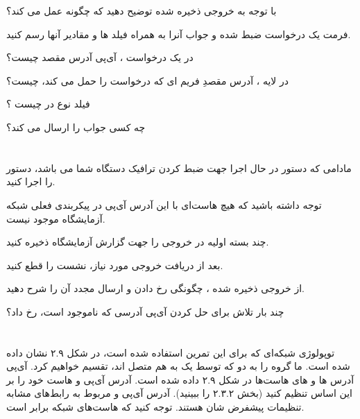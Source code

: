 \documentclass{../UTNetLabFa}
\begin{document}
	\begin{report}
		\item
		با توجه به خروجی ذخیره شده  توضیح دهید که  چگونه عمل می کند؟ 
		\item فرمت یک درخواست ضبط شده  و جواب آنرا به همراه فیلد ها و مقادیر آنها رسم کنید.
		\item در یک درخواست  ، آی‌پی آدرس مقصد چیست؟
		\item در لایه  ، آدرس  مقصدِ فریم ای که درخواست  را حمل می کند، چیست؟
		\item فیلد نوع  در  چیست ؟	
		\item چه کسی جواب  را ارسال می کند؟
	\end{report}
	
	\section{\textLR{ARP timeout}}
	
	مادامی که دستور  در حال اجرا جهت ضبط کردن ترافیک دستگاه شما می باشد، دستور \mbox{} را اجرا کنید.
	
	توجه داشته باشید که هیچ هاست‌ای با این آدرس آی‌پی در پیکربندی فعلی شبکه آزمایشگاه موجود نیست.
	
	چند بسته اولیه در خروجی  را جهت گزارش آزمایشگاه ذخیره کنید.
	
	بعد از دریافت خروجی مورد نیاز، نشست  را قطع کنید.
	
	\begin{report}
		\item
		 	از خروجی ذخیره شده  ، چگونگی رخ دادن  و ارسال مجدد آن را شرح دهید. 
		 \item 
		 چند بار تلاش برای حل کردن آی‌پی آدرسی که ناموجود است، رخ داد؟

	\end{report}

	\section{}
	
	توپولوژی شبکه‌ای که برای این تمرین  استفاده شده است، در شکل ۲.۹ نشان داده شده است. ما گروه را به دو  که توسط یک  به هم متصل اند، تقسیم خواهیم کرد. آی‌پی آدرس ها و \mbox{} های هاست‌ها در شکل ۲.۹ داده شده است. آدرس آی‌پی و \mbox{} هاست خود را بر این اساس تنظیم کنید (بخش ۲.۳.۲ را ببینید). آدرس آی‌پی و \mbox{} مربوط به رابط‌های  مشابه تنظیمات پیشفرض شان هستند. توجه کنید که \mbox{} هاست‌های شبکه  برابر  است.
	
\end{document}
